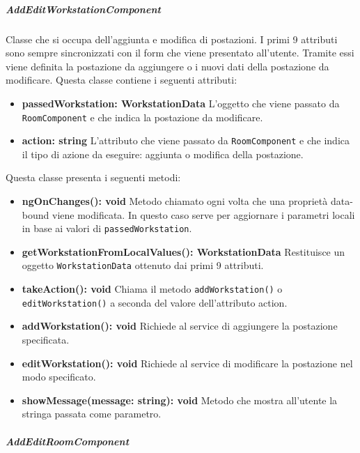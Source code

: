 \subparagraph{AddEditWorkstationComponent}
Classe che si occupa dell'aggiunta e modifica di postazioni. I primi 9 attributi sono sempre sincronizzati con il form che viene presentato all'utente. Tramite essi viene definita la postazione da aggiungere o i nuovi dati della postazione da modificare.\newline
Questa classe contiene i seguenti attributi:
\begin{itemize}
	\item \textbf{passedWorkstation: WorkstationData } \newline
	L'oggetto che viene passato da \texttt{RoomComponent} e che indica la postazione da modificare.
	\item \textbf{action: string} \newline
	L'attributo che viene passato da \texttt{RoomComponent} e che indica il tipo di azione da eseguire: aggiunta o modifica della postazione.
\end{itemize}
Questa classe presenta i seguenti metodi:
\begin{itemize}
	\item \textbf{ngOnChanges(): void } \newline
	Metodo chiamato ogni volta che una proprietà data-bound viene modificata. In questo caso serve per aggiornare i parametri locali in base ai valori di \texttt{passedWorkstation}.
	\item \textbf{getWorkstationFromLocalValues(): WorkstationData } \newline
	Restituisce un oggetto \texttt{WorkstationData} ottenuto dai primi 9 attributi.
	\item \textbf{takeAction(): void } \newline
	Chiama il metodo \texttt{addWorkstation()} o \texttt{editWorkstation()} a seconda del valore dell'attributo action.
	\item \textbf{addWorkstation(): void } \newline
	Richiede al service di aggiungere la postazione specificata.
	\item \textbf{editWorkstation(): void} \newline
	Richiede al service di modificare la postazione nel modo specificato.
	\item \textbf{showMessage(message: string): void} \newline
	Metodo che mostra all'utente la stringa passata come parametro.
	
\end{itemize}
\subparagraph{AddEditRoomComponent}
